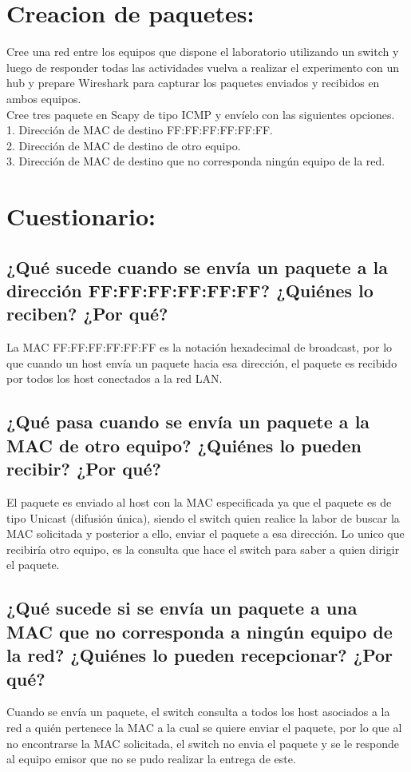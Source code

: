 \documentclass{article}
\begin{document}
\section{Creacion de paquetes:}
Cree una red entre los equipos que dispone el laboratorio utilizando un switch y luego de responder  todas las actividades vuelva a realizar el experimento con un hub y prepare Wireshark para capturar los  paquetes enviados y recibidos en ambos equipos.\\
Cree tres paquete en Scapy de tipo ICMP y envíelo con las siguientes opciones.\\

 1. Dirección de MAC de destino FF:FF:FF:FF:FF:FF. \\

 2. Dirección de MAC de destino de otro equipo.\\

 3. Dirección de MAC de destino que no corresponda ningún equipo de la red. \\

\section{Cuestionario:}
\subsection{¿Qué sucede cuando se envía un paquete a la dirección FF:FF:FF:FF:FF:FF? ¿Quiénes lo reciben? ¿Por qué?}
La MAC FF:FF:FF:FF:FF:FF es la notación hexadecimal de broadcast, por lo que cuando un host envía un paquete hacia esa dirección, el paquete es recibido por todos los host conectados a la red LAN.\\

\subsection{¿Qué pasa cuando se envía un paquete a la MAC de otro equipo? ¿Quiénes lo pueden recibir? ¿Por qué? }
El paquete es enviado al host con la MAC especificada ya que el paquete es de tipo Unicast (difusión única), siendo el switch quien realice la labor de buscar la MAC solicitada y posterior a ello, enviar el paquete a esa dirección. Lo unico que recibiría otro equipo, es la consulta que hace el switch para saber a quien dirigir el paquete.\\

\subsection{ ¿Qué sucede si se envía un paquete a una MAC que no corresponda a ningún equipo de la red? ¿Quiénes lo pueden recepcionar? ¿Por qué? }
Cuando se envía un paquete, el switch consulta a todos los host asociados a la red a quién pertenece la MAC a la cual se quiere enviar el paquete, por lo que al no encontrarse la MAC solicitada, el switch no envia el paquete y se le responde al equipo emisor que no se pudo realizar la entrega de este.\\
\end{document}
